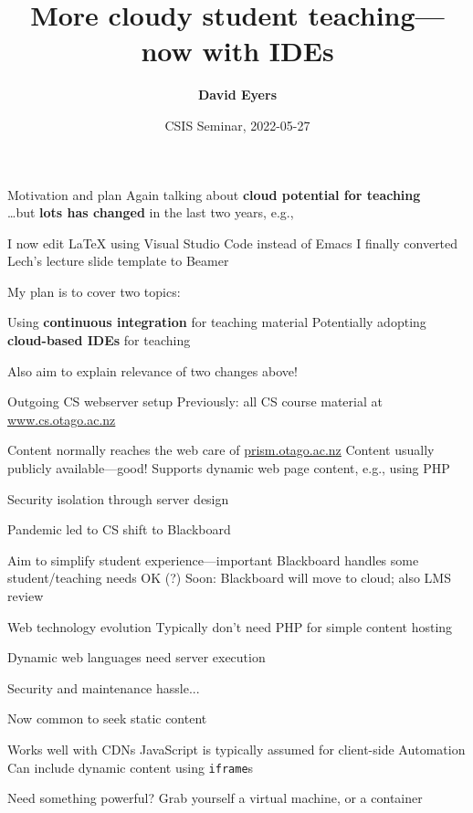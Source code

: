 \documentclass[aspectratio=169,t]{beamer}
\title[2022-05-27---CSIS Seminar---David Eyers]{More cloudy student teaching---now with IDEs}
\date{CSIS Seminar, 2022-05-27}
\author{\textbf{David Eyers}}
\begin{document}
\begin{frame}
  \titlepage
\end{frame}

\begin{dframe}{Motivation and plan}
  \1 Again talking about \textbf{cloud potential for teaching}\\
     \dots but \textbf{lots has changed} in the last two years, e.g.,

  \2 I now edit \LaTeX{} using Visual Studio Code instead of Emacs
  \2 I finally converted Lech's lecture slide template to Beamer
  
  \bigskip

  \1 My plan is to cover two topics:

  \2 Using \textbf{continuous integration} for teaching material
  \2 Potentially adopting \textbf{cloud-based IDEs} for teaching

  \bigskip

  \1 Also aim to explain relevance of two changes above!

\end{dframe}

\begin{dframe}{Outgoing CS webserver setup}
  \1 Previously: all CS course material at \url{www.cs.otago.ac.nz}

  \2 Content normally reaches the web care of \url{prism.otago.ac.nz}
  \2 Content usually publicly available---good!
  \2 Supports dynamic web page content, e.g., using PHP
  
  \3 Security isolation through server design

  \medskip

  \1 Pandemic led to CS shift to Blackboard

  \2 Aim to simplify student experience---important
  \2 Blackboard handles some student/teaching needs OK (?)
  \2 Soon: Blackboard will move to cloud; also LMS review
\end{dframe}

\begin{dframe}{Web technology evolution}
  \1 Typically don't need PHP for simple content hosting

  \2 Dynamic web languages need server execution
  
  \3 Security and maintenance hassle...

  \1 Now common to seek static content

  \2 Works well with CDNs
  \2 JavaScript is typically assumed for client-side Automation
  \2 Can include dynamic content using \texttt{iframe}s

  \1 Need something powerful? Grab yourself a virtual machine, or a container
\end{dframe}
\end{document}
